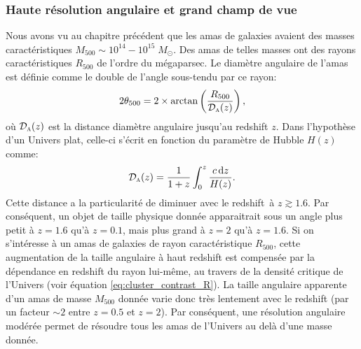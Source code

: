 \subsubsection{Haute résolution angulaire et grand champ de vue} %
Nous avons vu au chapitre précédent que les amas de galaxies avaient des masses caractéristiques $M_{500} \sim 10^{14} - 10^{15} \;M_\odot$.
Des amas de telles masses ont des rayons caractéristiques $R_{500}$ de l'ordre du mégaparsec.
Le diamètre angulaire de l'amas est définie comme le double de l'angle sous-tendu par ce rayon:
\begin{equation}
    2 \theta_{500} = 2 \times \arctan \left(\frac{R_{500}}{\mathcal{D}_\textsc{a}(z)} \right),
\end{equation}
où $\mathcal{D}_\textsc{a}(z)$ est la distance diamètre angulaire jusqu'au redshift $z$.
Dans l'hypothèse d'un Univers plat, celle-ci s'écrit en fonction du paramètre de Hubble $H(z)$ comme:
\begin{equation}
    \label{eq:da}
    \mathcal{D}_\textsc{a}(z) = \frac{1}{1+z} \int_0^z \frac{c \, \mathrm{d} z}{H(z)}.
\end{equation}
Cette distance a la particularité de diminuer avec le redshift\footnotemark\ à $z \gtrsim 1.6$.
Par conséquent, un objet de taille physique donnée apparaitrait sous un angle plus petit à $z = 1.6$ qu'à $z = 0.1$, mais plus grand à $z = 2$ qu'à $z = 1.6$.
Si on s'intéresse à un amas de galaxies de rayon caractéristique $R_{500}$, cette augmentation de la taille angulaire à haut redshift est compensée par la dépendance en redshift du rayon lui-même\footnotemark, au travers de la densité critique de l'Univers (voir équation \ref{eq:cluster_contrast_R}).
La taille angulaire apparente d'un amas de masse $M_{500}$ donnée varie donc très lentement avec le redshift (par un facteur $\sim 2$ entre $z=0.5$ et $z=2$).
Par conséquent, une résolution angulaire modérée permet de résoudre tous les amas de l'Univers au delà d'une masse donnée.

